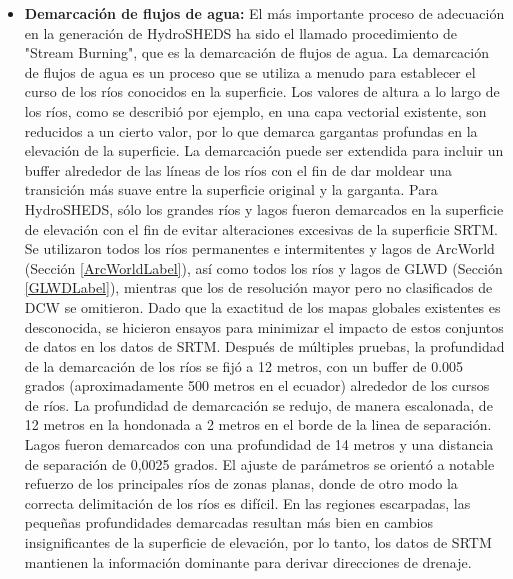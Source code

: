 \documentclass[10pt,a4paper, twoside]{report}
\begin{document}
\begin{itemize}
	\item \textbf{Demarcación de flujos de agua:} El más importante proceso de adecuación en la generación de HydroSHEDS ha sido el llamado procedimiento de "Stream Burning", que es la demarcación de flujos de agua. La demarcación de flujos de agua es un proceso que se utiliza a menudo para establecer el curso de los ríos conocidos en la superficie. Los valores de altura a lo largo de los ríos, como se describió por ejemplo, en una capa vectorial existente, son reducidos a un cierto valor, por lo que demarca gargantas profundas en la elevación de la superficie. La demarcación puede ser extendida para incluir un buffer alrededor de las líneas de los ríos con el fin de dar moldear una transición más suave entre la superficie original y la garganta. Para HydroSHEDS, sólo los grandes ríos y lagos fueron demarcados en la superficie de elevación con el fin de evitar alteraciones excesivas de la superficie SRTM. Se utilizaron todos los ríos permanentes e intermitentes y lagos de ArcWorld (Sección \ref{ArcWorldLabel}), así como todos los ríos y lagos de GLWD (Sección \ref{GLWDLabel}), mientras que los de resolución mayor pero no clasificados de DCW se omitieron. Dado que la exactitud de los mapas globales existentes es desconocida, se hicieron ensayos para minimizar el impacto de estos conjuntos de datos en los datos de SRTM. Después de múltiples pruebas, la profundidad de la demarcación de los ríos se fijó a 12 metros, con un buffer de 0.005 grados (aproximadamente 500 metros en el ecuador) alrededor de los cursos de ríos. La profundidad de demarcación se redujo, de manera escalonada, de 12 metros en la hondonada a 2 metros en el borde de la linea de separación. Lagos fueron demarcados con una profundidad de 14 metros y una distancia de separación de 0,0025 grados. El ajuste de parámetros se orientó a notable refuerzo de los principales ríos de zonas planas, donde de otro modo la correcta delimitación de los ríos es difícil. En las regiones escarpadas, las pequeñas profundidades demarcadas resultan más bien en cambios insignificantes de la superficie de elevación, por lo tanto, los datos de SRTM mantienen la información dominante para derivar direcciones de drenaje.	
	

\end{itemize}
\end{document}
